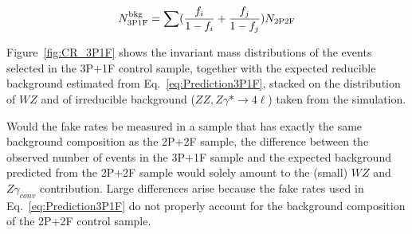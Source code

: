 \begin{equation} 
\label{eq:Prediction3P1F}
N^{\rm bkg}_{\rm 3P1F} = \sum (\frac{f_{i}}{1-f_{i}}
+ \frac{f_{j}}{1-f_{j}}) N_{\rm 2P2F}
\end{equation} 

Figure~\ref{fig:CR_3P1F} shows the invariant mass distributions of the
events selected in the 3P+1F control sample, together with the expected
reducible background estimated from Eq.~\ref{eq:Prediction3P1F},
stacked on the distribution
of $WZ$ and of irreducible background ($ZZ, Z\gamma* \to 4\ell$) taken from the simulation.

Would the fake rates be measured in a sample that has exactly the same
background composition as the 2P+2F sample, the difference between the
observed number of events in the 3P+1F sample and the expected background
predicted from the 2P+2F sample would solely amount to the (small) $WZ$ and $Z\gamma_{conv}$
contribution. Large differences arise because the fake rates used in
Eq.~\ref{eq:Prediction3P1F} do not properly account for the background
composition of the 2P+2F control sample.


